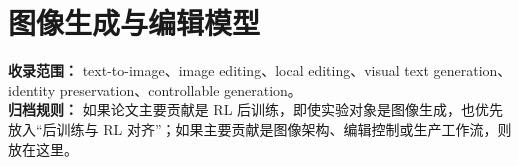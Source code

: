 
\section*{图像生成与编辑模型}
{}

\begin{conceptbox}
\textbf{收录范围：} text-to-image、image editing、local editing、visual text generation、identity preservation、controllable generation。\\
\textbf{归档规则：} 如果论文主要贡献是 RL 后训练，即使实验对象是图像生成，也优先放入“后训练与 RL 对齐”；如果主要贡献是图像架构、编辑控制或生产工作流，则放在这里。
\end{conceptbox}








